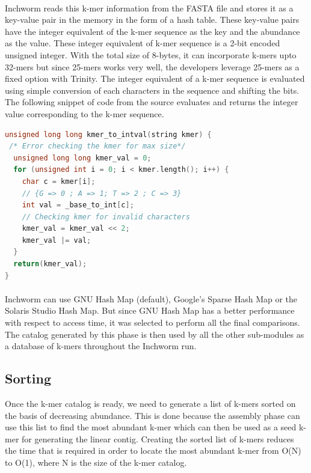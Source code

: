 \label{key}\documentclass[bachinf, english ,zihtitle,final,hyperref,utf8]{zihpub}
\begin{document}
\paragraph{} Inchworm reads this k-mer information from the FASTA file and stores it as a key-value pair in the memory in the form of a hash table. These key-value pairs have the integer equivalent of the k-mer sequence as the key and the abundance as the value. These integer equivalent of k-mer sequence is a 2-bit encoded unsigned integer. With the total size of 8-bytes, it can incorporate k-mers upto 32-mers but since 25-mers works very well, the developers leverage 25-mers as a fixed option with Trinity. The integer equivalent of a k-mer sequence is evaluated using simple conversion of each  characters in the sequence and shifting the bits. The following snippet of code from the source evaluates and returns the integer value corresponding to the k-mer sequence.
\begin{center}
\begin{lstlisting}[language=C++]
unsigned long long kmer_to_intval(string kmer) {  
 /* Error checking the kmer for max size*/
  unsigned long long kmer_val = 0;  
  for (unsigned int i = 0; i < kmer.length(); i++) {
	char c = kmer[i];
	// {G => 0 ; A => 1; T => 2 ; C => 3}
	int val = _base_to_int[c];
	// Checking kmer for invalid characters
	kmer_val = kmer_val << 2;
	kmer_val |= val;	
  }  
  return(kmer_val);
}
\end{lstlisting}
\end{center}
\paragraph{} Inchworm can use GNU Hash Map (default), Google's Sparse Hash Map or the  Solaris Studio Hash Map. But since GNU Hash Map has a better performance with respect to access time, it was selected to perform all the final comparisons. The catalog generated by this phase is then used by all the other sub-modules as a database of k-mers throughout the Inchworm run.
\subsection{Sorting}
Once the k-mer catalog is ready, we need to generate a list of k-mers sorted on the basis of decreasing abundance. This is done because the assembly phase can use this list to find the most abundant k-mer which can then be used as a seed k-mer for generating the linear contig. Creating the sorted list of k-mers reduces the time that is required in order to locate the most abundant k-mer from O(N) to O(1), where N is the size of the k-mer catalog.
\end{document}
